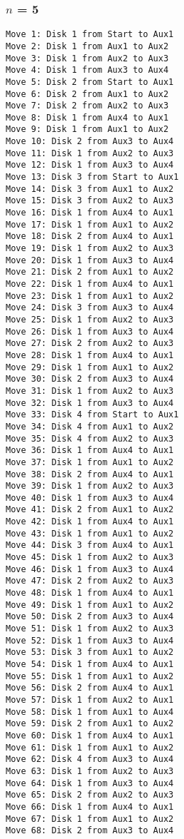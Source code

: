 \documentclass[11pt]{article}
\begin{document}
\begin{multicols}{2}
\subsubsection*{$n$ = 5}

\begin{Verbatim}[fontsize=\small]
Move 1: Disk 1 from Start to Aux1
Move 2: Disk 1 from Aux1 to Aux2
Move 3: Disk 1 from Aux2 to Aux3
Move 4: Disk 1 from Aux3 to Aux4
Move 5: Disk 2 from Start to Aux1
Move 6: Disk 2 from Aux1 to Aux2
Move 7: Disk 2 from Aux2 to Aux3
Move 8: Disk 1 from Aux4 to Aux1
Move 9: Disk 1 from Aux1 to Aux2
Move 10: Disk 2 from Aux3 to Aux4
Move 11: Disk 1 from Aux2 to Aux3
Move 12: Disk 1 from Aux3 to Aux4
Move 13: Disk 3 from Start to Aux1
Move 14: Disk 3 from Aux1 to Aux2
Move 15: Disk 3 from Aux2 to Aux3
Move 16: Disk 1 from Aux4 to Aux1
Move 17: Disk 1 from Aux1 to Aux2
Move 18: Disk 2 from Aux4 to Aux1
Move 19: Disk 1 from Aux2 to Aux3
Move 20: Disk 1 from Aux3 to Aux4
Move 21: Disk 2 from Aux1 to Aux2
Move 22: Disk 1 from Aux4 to Aux1
Move 23: Disk 1 from Aux1 to Aux2
Move 24: Disk 3 from Aux3 to Aux4
Move 25: Disk 1 from Aux2 to Aux3
Move 26: Disk 1 from Aux3 to Aux4
Move 27: Disk 2 from Aux2 to Aux3
Move 28: Disk 1 from Aux4 to Aux1
Move 29: Disk 1 from Aux1 to Aux2
Move 30: Disk 2 from Aux3 to Aux4
Move 31: Disk 1 from Aux2 to Aux3
Move 32: Disk 1 from Aux3 to Aux4
Move 33: Disk 4 from Start to Aux1
Move 34: Disk 4 from Aux1 to Aux2
Move 35: Disk 4 from Aux2 to Aux3
Move 36: Disk 1 from Aux4 to Aux1
Move 37: Disk 1 from Aux1 to Aux2
Move 38: Disk 2 from Aux4 to Aux1
Move 39: Disk 1 from Aux2 to Aux3
Move 40: Disk 1 from Aux3 to Aux4
Move 41: Disk 2 from Aux1 to Aux2
Move 42: Disk 1 from Aux4 to Aux1
Move 43: Disk 1 from Aux1 to Aux2
Move 44: Disk 3 from Aux4 to Aux1
Move 45: Disk 1 from Aux2 to Aux3
Move 46: Disk 1 from Aux3 to Aux4
Move 47: Disk 2 from Aux2 to Aux3
Move 48: Disk 1 from Aux4 to Aux1
Move 49: Disk 1 from Aux1 to Aux2
Move 50: Disk 2 from Aux3 to Aux4
Move 51: Disk 1 from Aux2 to Aux3
Move 52: Disk 1 from Aux3 to Aux4
Move 53: Disk 3 from Aux1 to Aux2
Move 54: Disk 1 from Aux4 to Aux1
Move 55: Disk 1 from Aux1 to Aux2
Move 56: Disk 2 from Aux4 to Aux1
Move 57: Disk 1 from Aux2 to Aux1
Move 58: Disk 1 from Aux1 to Aux4
Move 59: Disk 2 from Aux1 to Aux2
Move 60: Disk 1 from Aux4 to Aux1
Move 61: Disk 1 from Aux1 to Aux2
Move 62: Disk 4 from Aux3 to Aux4
Move 63: Disk 1 from Aux2 to Aux3
Move 64: Disk 1 from Aux3 to Aux4
Move 65: Disk 2 from Aux2 to Aux3
Move 66: Disk 1 from Aux4 to Aux1
Move 67: Disk 1 from Aux1 to Aux2
Move 68: Disk 2 from Aux3 to Aux4

\end{Verbatim}
\end{multicols}
\end{document}
